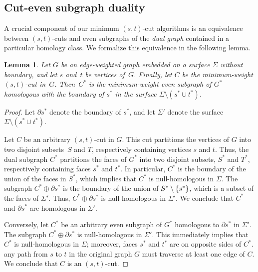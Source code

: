 \documentclass[11pt,twoside]{article}
\newtheorem{lemma}[theorem]{Lemma}
\begin{document}
\subsection{Cut-even subgraph duality}
\label{SS:duality}


A crucial component of our minimum $(s,t)$-cut algorithms is an equivalence between $(s,t)$-cuts and even subgraphs of the \emph{dual graph} contained in a particular homology class.  
We formalize this equivalence in the following lemma.

\begin{lemma}
\label{lem:cut-duality}
Let $G$ be an edge-weighted graph embedded on a surface $\Sigma$ without boundary, and let $s$ and~$t$ be vertices of~$G$.  Finally, let $C$ be the minimum-weight $(s,t)$-cut in~$G$.  Then~$C^*$ is the minimum-weight even subgraph of $G^*$ homologous with the boundary of $s^*$ in the surface $\Sigma\setminus(s^*\cup t^*)$.
\end{lemma}

\begin{proof}
Let $\partial s^*$ denote the boundary of $s^*$, and let $\Sigma'$ denote the surface $\Sigma\setminus {(s^*\cup t^*)}$.

Let $C$ be an arbitrary $(s,t)$-cut in $G$.  This cut partitions the vertices of $G$ into two disjoint subsets~$S$ and $T$, respectively containing vertices $s$ and $t$.  Thus, the dual subgraph $C^*$ partitions the faces of $G^*$ into two disjoint subsets, $S^*$ and $T^*$, respectively containing faces $s^*$ and $t^*$.  In particular, $C^*$ is the boundary of the union of the faces in $S^*$, which implies that $C^*$ is null-homologous in $\Sigma$.  The subgraph $C^* \oplus \partial s^*$ is the boundary of the union of $S^* \setminus\{ s^* \}$, which is a subset of the faces of $\Sigma'$.  Thus,  $C^*\oplus \partial s^*$ is null-homologous in $\Sigma'$.  We conclude that $C^*$ and  $\partial s^*$ are homologous in $\Sigma'$.

Conversely, let $C^*$ be an arbitrary even subgraph of $G^*$ homologous to $\partial s^*$ in $\Sigma'$.  The subgraph $C^*\oplus \partial s^*$ is null-homologous in $\Sigma'$.  This immediately implies that $C^*$ is null-homologous in $\Sigma$; moreover, faces $s^*$ and $t^*$ are on opposite sides of $C^*$.   any path from $s$ to $t$ in the original graph $G$ must traverse at least one edge of $C$.  We conclude that $C$ is an $(s,t)$-cut.
\end{proof}
\end{document}
